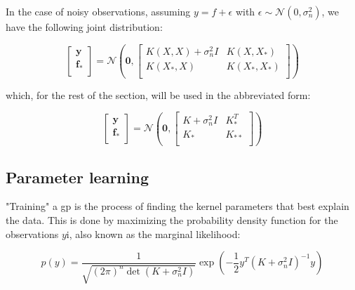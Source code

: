 In the case of noisy observations, assuming $y = f + \epsilon$  with $\epsilon
\sim \mathcal{N}(0, \sigma_n^2)$, we have the following joint distribution:

\begin{equation}
    \begin{bmatrix}
        \mathbf{y} \\
        \mathbf{f_*} \\
    \end{bmatrix} = 
    \mathcal{N}\left(
        \mathbf{0}, 
        \begin{bmatrix}
            K(X, X) + \sigma_n^2 I& K(X, X_*) \\
            K(X_*, X) & K(X_*, X_*) \\
        \end{bmatrix}
    \right)
\end{equation}

which, for the rest of the section, will be used in the abbreviated form:

\begin{equation}
    \begin{bmatrix}
        \mathbf{y} \\
        \mathbf{f_*} \\
    \end{bmatrix} = 
    \mathcal{N}\left(
        \mathbf{0}, 
        \begin{bmatrix}
            K + \sigma_n^2 I& K_*^T \\
            K_* & K_{**} \\
        \end{bmatrix}
    \right)
\end{equation}


\subsection{Parameter learning}

"Training" a \acrshort{gp} is the process of finding the kernel parameters that
best explain the data. This is done by maximizing the probability density
function for the observations $y$i, also known as the marginal likelihood:

\begin{equation}\label{eq:gp_likelihood}
    p(y) = \frac{1}{\sqrt{(2\pi)^{n}\det{\left(K + \sigma_n^2I\right)}}}
    \exp{\left(-\frac{1}{2}y^T\left(K + \sigma_n^2I\right)^{-1}y\right)}
\end{equation}

